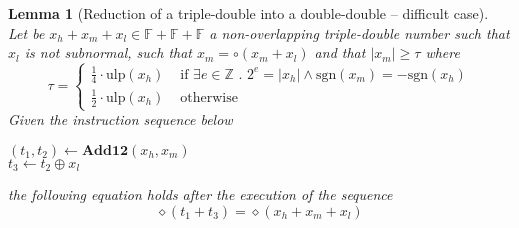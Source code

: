 \documentclass[a4paper,10pt,twoside]{article}
\newtheorem{lemma}[theorem]{Lemma}
\newcommand{\Z}{\ensuremath{\mathbb {Z}}}
\newcommand{\F}{\ensuremath{\mathbb {F}}}
\newcommand{\hi}{\ensuremath{\mathit{h}}}
\newcommand{\mi}{\ensuremath{\mathit{m}}}
\newcommand{\lo}{\ensuremath{\mathit{l}}}
\newcommand{\mAdd}{\ensuremath{\mathbf{Add12}}}
\newcommand{\mUlp}{\ensuremath{\mathrm{ulp}}}
\newcommand{\sgn}{\ensuremath{\mathrm{sgn}}}
\begin{document}
\begin{lemma}[Reduction of a triple-double into a double-double -- difficult case] \label{plusdunmiulp} ~ \\
Let be $x_\hi + x_\mi + x_\lo \in \F + \F + \F$ a non-overlapping triple-double number such that $x_\lo$ is not subnormal, such that
$x_\mi = \circ \left( x_\mi + x_\lo \right)$ and that $\left \vert x_\mi \right \vert \geq \tau$ where
$$\tau = \left \lbrace \begin{array}{ll} 
\frac{1}{4} \cdot \mUlp\left( x_\hi \right) & \mbox{ if } \exists e \in \Z \mbox{ . } 2^e = \left \vert x_\hi \right \vert \land 
\sgn\left( x_\mi \right) = -\sgn\left( x_\hi \right)\\
\frac{1}{2} \cdot \mUlp\left( x_\hi \right) & \mbox{ otherwise} \end{array} \right.$$
Given the instruction sequence below
\begin{center}
\begin{minipage}[b]{50mm}
$\left( t_1, t_2 \right) \gets \mAdd\left( x_\hi, x_\mi \right)$ \\
$t_3 \gets t_2 \oplus x_\lo$
\end{minipage}
\end{center}
the following equation holds after the execution of the sequence
$$\diamond\left( t_1 + t_3 \right) = \diamond\left( x_\hi + x_\mi + x_\lo \right)$$
\end{lemma}
\end{document}

